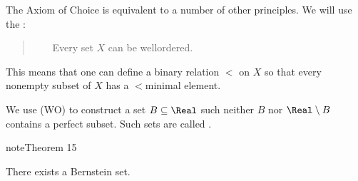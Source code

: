\documentclass[letterpaper,10pt,english]{jupyterBook}
\begin{document}
\sphinxAtStartPar
The Axiom of Choice is equivalent to a number of other principles. We will use the :
\begin{quote}

\sphinxAtStartPar
{}     Every set \(X\) can be well\sphinxhyphen{}ordered.
\end{quote}

\sphinxAtStartPar
This means that one can define a binary relation \(<\) on \(X\) so that every non\sphinxhyphen{}empty subset of \(X\) has a \(<\)\sphinxhyphen{}minimal element.

\sphinxAtStartPar
We use (WO) to construct a set \(B\subseteq \Real\) such neither \(B\) nor \(\Real\setminus B\) contains a perfect subset. Such sets are called .
\label{choice:thm-Bernstein}
\begin{sphinxadmonition}{note}{Theorem 15}



\sphinxAtStartPar
There exists a Bernstein set.
\end{sphinxadmonition}
\end{document}
